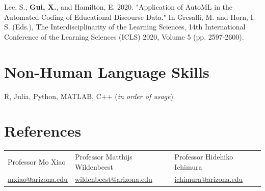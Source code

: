 \documentclass[margin,line]{res}
\begin{document}
\begin{resume}
\noindent Lee, S., \textbf{Gui, X.}, and Hamilton, E. 2020. "Application of AutoML in the Automated Coding of Educational Discourse Data." In Gresalfi, M. and Horn, I. S. (Eds.), The Interdisciplinarity of the Learning Sciences, 14th International Conference of the Learning Sciences (ICLS) 2020, Volume 5 (pp. 2597-2600).

\section{\sc Non-Human Language Skills} R, Julia, Python, MATLAB, C++ {\small (\textit{in order of usage})}

\section{\sc References}

\begin{tabular}{@{}p{1.5in}p{2.2in}p{2in}}
    Professor Mo Xiao & Professor Matthijs Wildenbeest & Professor Hidehiko Ichimura \\
    \href{mailto:mxiao@arizona.edu}{mxiao@arizona.edu} & \href{mailto:wildenbeest@arizona.edu}{wildenbeest@arizona.edu} & \href{mailto:ichimura@arizona.edu}{ichimura@arizona.edu} \\
\end{tabular}




\end{resume}
\end{document}
